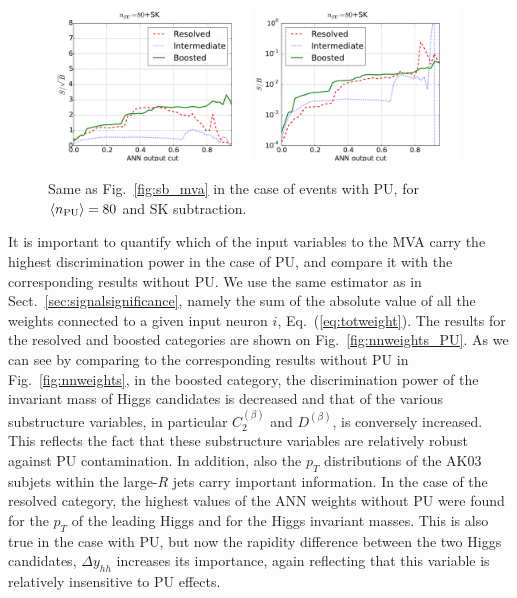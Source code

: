 \begin{figure}[t]
\begin{center}
\includegraphics[width=0.48\textwidth]{plots/ssb_SKPU80.pdf}
\includegraphics[width=0.48\textwidth]{plots/sb_SKPU80.pdf}
\caption{\small 
Same as Fig.~\ref{fig:sb_mva} in the
case of events with PU, for
 $\left\langle n_{\rm PU}\right\rangle=80$ 
  and SK subtraction.
}
\label{fig:sb_mva_PU}
\end{center}
\end{figure}

It is important to quantify which of the input variables
to the MVA carry the highest discrimination power
in the case of PU,
and compare it with the corresponding
results without PU.
%
We use the same estimator as in Sect.~\ref{sec:signalsignificance},
namely the sum
of the absolute value of all the weights connected to a given
input neuron $i$, Eq.~(\ref{eq:totweight}).
%
The results for the resolved and boosted categories are shown
on Fig.~\ref{fig:nnweights_PU}.
%
As we can see by comparing to the corresponding
results without PU in Fig.~\ref{fig:nnweights}, 
in the boosted category, the discrimination power of the invariant
mass of Higgs candidates is decreased and that of the various substructure
variables, in particular $C_2^{(\beta)}$ and
$D^{(\beta)}$, is conversely
increased.
%
This reflects the fact that these substructure variables are
relatively robust against PU contamination.
%
In addition, also the $p_T$ distributions of the AK03
subjets within the large-$R$
jets carry important information.
%
In the case of the resolved category,  the highest
values of the ANN weights without PU
were found for the $p_T$ of the leading
Higgs and for the Higgs invariant masses.
%
This is also true in the case with PU, but now the rapidity difference
between the two Higgs candidates, $\Delta y_{hh}$ increases its
importance, again reflecting that this variable is relatively
insensitive to PU effects.
%

